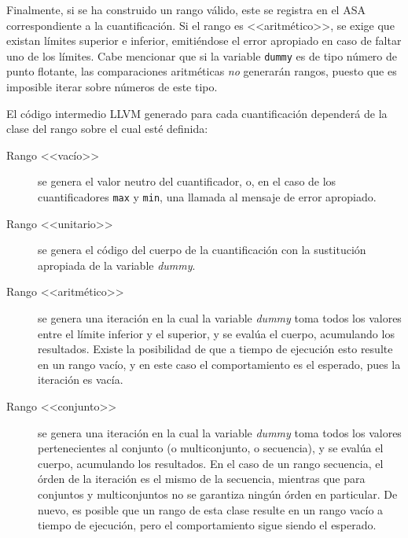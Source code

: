 Finalmente, si se ha construido un rango válido, este se registra en
el ASA correspondiente a la cuantificación. Si el rango es <<aritmético>>, se
exige que existan límites superior e inferior, emitiéndose el error apropiado en
caso de faltar uno de los límites. Cabe mencionar que si la variable
\texttt{dummy} es de tipo número de punto flotante, las comparaciones
aritméticas \emph{no} generarán rangos, puesto que es imposible iterar sobre
números de este tipo. 

El código intermedio LLVM generado para cada cuantificación dependerá de la
clase del rango sobre el cual esté definida:

\begin{description}

  \item [Rango <<vacío>>] se genera el valor neutro del cuantificador, o, en el
caso de los cuantificadores \texttt{max} y \texttt{min}, una llamada al mensaje
de error apropiado.

  \item [Rango <<unitario>>] se genera el código del cuerpo de la cuantificación
con la sustitución apropiada de la variable \emph{dummy}.

  \item [Rango <<aritmético>>] se genera una iteración en la cual la variable
\emph{dummy} toma todos los valores entre el límite inferior y el superior, y se
evalúa el cuerpo, acumulando los resultados. Existe la posibilidad de que a
tiempo de ejecución esto resulte en un rango vacío, y en este caso el
comportamiento es el esperado, pues la iteración es vacía.

  \item [Rango <<conjunto>>] se genera una iteración en la cual la variable
\emph{dummy} toma todos los valores pertenecientes al conjunto (o multiconjunto,
o secuencia), y se evalúa el cuerpo, acumulando los resultados. En el caso de un
rango secuencia, el órden de la iteración es el mismo de la secuencia, mientras
que para conjuntos y multiconjuntos no se garantiza ningún órden en particular.
De nuevo, es posible que un rango de esta clase resulte en un rango vacío a
tiempo de ejecución, pero el comportamiento sigue siendo el esperado.

\end{description}

